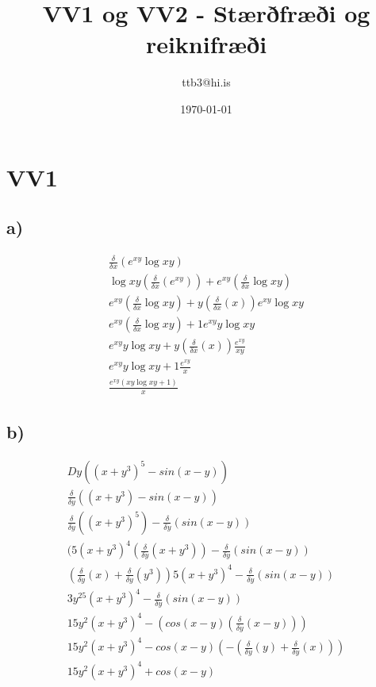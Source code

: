 \documentclass{article}
\title{VV1 og VV2 - Stærðfræði og reiknifræði}
\author{ttb3@hi.is}
\date{\today}
\begin{document}
\maketitle

\section*{VV1}
\subsection*{a)}
\begin{align*}
    \frac{\delta}{\delta x}(e^{xy}\log{xy})\\
    \log{xy}(\frac{\delta}{\delta x}(e^{xy}))+e^{xy}(\frac{\delta}{\delta x}\log{xy})\\
    e^{xy}(\frac{\delta}{\delta x}\log{xy})+y(\frac{\delta}{\delta x}(x))e^{xy}\log{xy}\\
    e^{xy}(\frac{\delta}{\delta x}\log{xy})+1e^{xy}y\log{xy}\\
    e^{xy}y\log{xy}+y(\frac{\delta}{\delta x}(x))\frac{e^{xy}}{xy}\\
    e^{xy}y\log{xy}+1\frac{e^{xy}}{x}\\
    \frac{e^{xy}(xy\log{xy}+1)}{x}
\end{align*}

\subsection*{b)}
\begin{align*}
    Dy((x+y^3)^5-sin(x-y))\\
    \frac{\delta}{\delta y}((x+y^3)-sin(x-y))\\
    \frac{\delta}{\delta y}((x+y^3)^5)-\frac{\delta}{\delta y}(sin(x-y))\\
    (5(x+y^3)^4(\frac{\delta}{\delta y}(x+y^3))-\frac{\delta}{\delta y}(sin(x-y))\\
    (\frac{\delta}{\delta y}(x)+\frac{\delta}{\delta y}(y^3))5(x+y^3)^4-\frac{\delta}{\delta y}(sin(x-y))\\
    3y^25(x+y^3)^4-\frac{\delta}{\delta y}(sin(x-y))\\
    15y^2(x+y^3)^4-(cos(x-y)(\frac{\delta}{\delta y}(x-y)))\\
    15y^2(x+y^3)^4-cos(x-y)(-(\frac{\delta}{\delta y}(y)+\frac{\delta}{\delta y}(x)))\\
    15y^2(x+y^3)^4+cos(x-y)
\end{align*}
\end{document}
